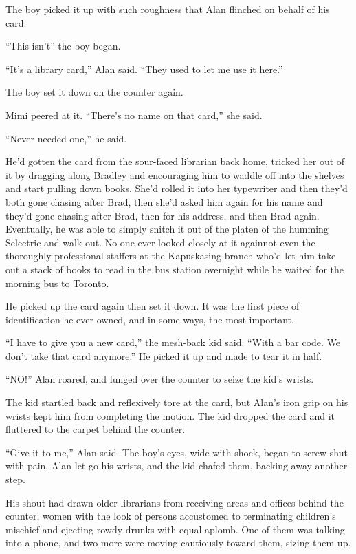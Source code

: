 The boy picked it up with such roughness that Alan flinched on behalf
of his card.

``This isn't\dash{}'' the boy began.

``It's a library card,'' Alan said.  ``They used to let me use it
here.''

The boy set it down on the counter again.

Mimi peered at it.  ``There's no name on that card,'' she said.

``Never needed one,'' he said.

He'd gotten the card from the sour-faced librarian back home, tricked
her out of it by dragging along Bradley and encouraging him to waddle
off into the shelves and start pulling down books.  She'd rolled it
into her typewriter and then they'd both gone chasing after Brad, then
she'd asked him again for his name and they'd gone chasing after Brad,
then for his address, and then Brad again.  Eventually, he was able to
simply snitch it out of the platen of the humming Selectric and walk
out.  No one ever looked closely at it again\dash{}not even the thoroughly
professional staffers at the Kapuskasing branch who'd let him take out
a stack of books to read in the bus station overnight while he waited
for the morning bus to Toronto.

He picked up the card again then set it down.  It was the first piece
of identification he ever owned, and in some ways, the most important.

``I have to give you a new card,'' the mesh-back kid said.  ``With a
bar code.  We don't take that card anymore.'' He picked it up and made
to tear it in half.

``NO!'' Alan roared, and lunged over the counter to seize the kid's
wrists.

The kid startled back and reflexively tore at the card, but Alan's
iron grip on his wrists kept him from completing the motion.  The kid
dropped the card and it fluttered to the carpet behind the counter.

``Give it to me,'' Alan said.  The boy's eyes, wide with shock, began
to screw shut with pain.  Alan let go his wrists, and the kid chafed
them, backing away another step.

His shout had drawn older librarians from receiving areas and offices
behind the counter, women with the look of persons accustomed to
terminating children's mischief and ejecting rowdy drunks with equal
aplomb.  One of them was talking into a phone, and two more were
moving cautiously toward them, sizing them up.

